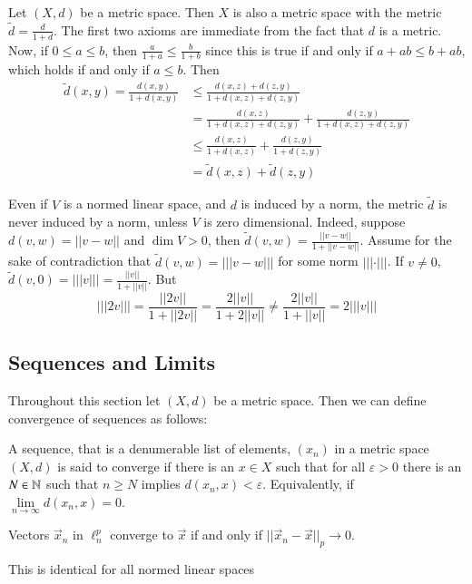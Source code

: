 \begin{example}
    Let $(X,d)$ be a metric space. Then $X$ is also a metric space with the metric $\tilde{d} = \frac{d}{1+d}$. The first two axioms are immediate from the fact that $d$ is a metric. Now, if $0 \leq a \leq b$, then $\frac{a}{1+a} \leq \frac{b}{1+b}$ since this is true if and only if $a+ab \leq b + ab$, which holds if and only if $a \leq b$. Then \begin{align*}
        \tilde{d}(x,y) = \frac{d(x,y)}{1+d(x,y)} &\leq \frac{d(x,z) + d(z,y)}{1+d(x,z)+d(z,y)} \\
        &= \frac{d(x,z)}{1+d(x,z)+d(z,y)} + \frac{d(z,y)}{1+d(x,z)+d(z,y)} \\
        &\leq \frac{d(x,z)}{1+d(x,z)} + \frac{d(z,y)}{1+d(z,y)} \\
        &= \tilde{d}(x,z) + \tilde{d}(z,y)
    \end{align*}
\end{example}

Even if $V$ is a normed linear space, and $d$ is induced by a norm, the metric $\tilde{d}$ is never induced by a norm, unless $V$ is zero dimensional. Indeed, suppose $d(v,w) = ||v-w||$ and $\dim V > 0$, then $\tilde{d}(v,w) = \frac{||v-w||}{1+||v-w||}$. Assume for the sake of contradiction that $\tilde{d}(v,w) = |||v-w|||$ for some norm $|||\cdot |||$. If $v \neq 0$, $\tilde{d}(v,0) = |||v||| = \frac{||v||}{1+||v||}$. But $$|||2v||| = \frac{||2v||}{1+||2v||} = \frac{2||v||}{1+2||v||} \neq \frac{2||v||}{1+||v||} = 2|||v|||$$


\subsection{Sequences and Limits}

Throughout this section let $(X,d)$ be a metric space. Then we can define convergence of sequences as follows: 

\begin{definition}
    A sequence, that is a denumerable list of elements, $(x_n)$ in a metric space $(X,d)$ is said to converge if there is an $x \in X$ such that for all $\varepsilon > 0$ there is an $N \in \mathbb N$ such that $n \geq N$ implies $d(x_n,x) < \varepsilon$. Equivalently, if $\lim\limits_{n\rightarrow \infty}d(x_n,x) = 0$.
\end{definition}

\begin{example}
    Vectors $\vec{x}_n$ in $\ell_n^p$ converge to $\vec{x}$ if and only if $||\vec{x}_n - \vec{x}||_p\rightarrow 0$.
\end{example}
This is identical for all normed linear spaces

